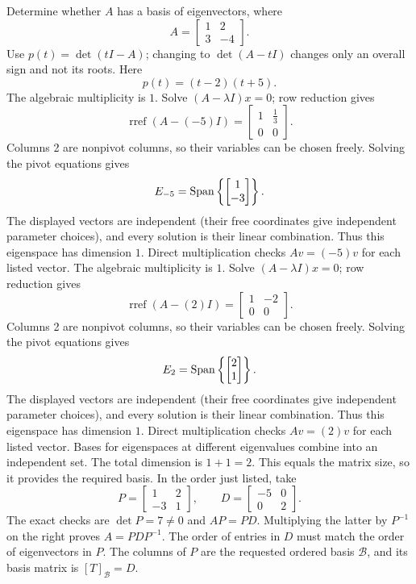 \goal Determine whether $A$ has a basis of eigenvectors, where
\[A=\begin{bmatrix}1&2\\3&-4\end{bmatrix}.\]
Use $p(t)=\det(tI-A)$; changing to $\det(A-tI)$ changes only an overall sign and not its roots. Here
\[p(t)=\left(t - 2\right) \left(t + 5\right).\]
The algebraic multiplicity is $1$. Solve $(A-\lambda I)x=0$; row reduction gives
\[\operatorname{rref}(A-(-5)I)=\begin{bmatrix}1&\frac{1}{3}\\0&0\end{bmatrix}.\]
Columns 2 are nonpivot columns, so their variables can be chosen freely. Solving the pivot equations gives
\[E_{-5}=\operatorname{Span}\left\{\begin{bmatrix}1\\-3\end{bmatrix}\right\}.\]
The displayed vectors are independent (their free coordinates give independent parameter choices), and every solution is their linear combination. Thus this eigenspace has dimension $1$. Direct multiplication checks $Av=(-5)v$ for each listed vector.
The algebraic multiplicity is $1$. Solve $(A-\lambda I)x=0$; row reduction gives
\[\operatorname{rref}(A-(2)I)=\begin{bmatrix}1&-2\\0&0\end{bmatrix}.\]
Columns 2 are nonpivot columns, so their variables can be chosen freely. Solving the pivot equations gives
\[E_{2}=\operatorname{Span}\left\{\begin{bmatrix}2\\1\end{bmatrix}\right\}.\]
The displayed vectors are independent (their free coordinates give independent parameter choices), and every solution is their linear combination. Thus this eigenspace has dimension $1$. Direct multiplication checks $Av=(2)v$ for each listed vector.
Bases for eigenspaces at different eigenvalues combine into an independent set. The total dimension is $1+1=2$.
This equals the matrix size, so it provides the required basis. In the order just listed, take
\[P=\begin{bmatrix}1&2\\-3&1\end{bmatrix},\qquad D=\begin{bmatrix}-5&0\\0&2\end{bmatrix}.\]
The exact checks are $\det P=7\ne0$ and $AP=PD$. Multiplying the latter by $P^{-1}$ on the right proves $A=PDP^{-1}$. The order of entries in $D$ must match the order of eigenvectors in $P$.
The columns of $P$ are the requested ordered basis $\mathcal B$, and its basis matrix is $[T]_{\mathcal B}=D$.

